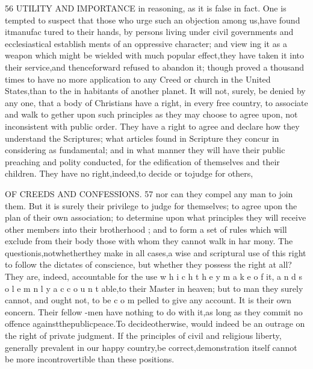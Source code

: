 \documentclass[
]{book}
\begin{document}
56 UTILITY AND IMPORTANCE
in reasoning, as it is false in fact. One is
tempted to suspect that those who urge such an objection among us,have found itmanufac tured to their hands, by persons living under civil governments and ecclesiastical establish ments of an oppressive character; and view ing it as a weapon which might be wielded with much popular effect,they have taken it into their service,and thenceforward refused to abandon it; though proved a thousand times to have no more application to any Creed or
church in the United States,than to the in habitants of another planet.
It will not, surely, be denied by any one,
that a body of Christians have a right, in every free country, to associate and walk to
gether upon such principles as they may choose to agree upon, not inconsistent with public order. They have a right to agree and declare how they understand the Scriptures; what articles found in Scripture they concur in considering as fundamental; and in what manner they will have their public preaching and polity conducted, for the edification of themselves and their children. They have no
right,indeed,to decide or tojudge for others,

OF CREEDS AND CONFESSIONS. 57
nor can they compel any man to join them. But it is surely their privilege to judge for themselves; to agree upon the plan of their own association; to determine upon what
principles they will receive other members into their brotherhood ; and to form a set of rules which will exclude from their body those with whom they cannot walk in har mony. The questionis,notwhetherthey make in all cases,a wise and scriptural use of this right to follow the dictates of conscience, but whether they possess the right at all? They are, indeed, accountable for the use w h i c h t h e y m a k e o f it, a n d s o l e m n l y a c c o u n t able,to their Master in heaven; but to man they surely cannot, and ought not, to be c o m
pelled to give any account. It is their own
eoncern. Their fellow -men have nothing to do with it,as long as they commit no offence
againstthepublicpeace.To decideotherwise, would indeed be an outrage on the right of private judgment. If the principles of civil
and religious liberty, generally prevalent in our happy country,be correct,demonstration itself cannot be more incontrovertible than
these positions.
\end{document}
